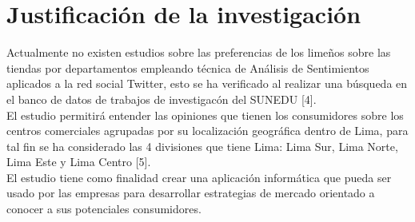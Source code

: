 
\chapter{Justificación de la investigaci\'on}

Actualmente no existen estudios sobre las preferencias  de los lime\~nos sobre las tiendas por departamentos empleando técnica de Análisis de Sentimientos aplicados a la red social Twitter, esto se ha verificado al realizar una b\'usqueda en el banco de datos de trabajos de investigac\'on del SUNEDU [4]. \\

El estudio permitirá entender las opiniones que tienen los consumidores sobre los centros 
comerciales agrupadas por su 
localización geográfica dentro de Lima, para tal fin se ha considerado las 4 divisiones 
que tiene Lima:  Lima Sur, Lima Norte, Lima Este y Lima Centro [5].  \\

El estudio tiene como finalidad crear una aplicación informática que pueda ser usado 
por las empresas para desarrollar estrategias de mercado orientado a conocer a sus 
potenciales consumidores.

\cleardoublepage